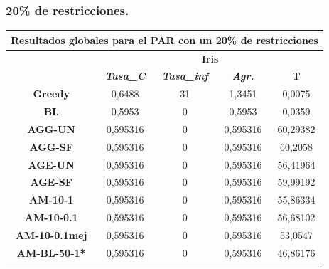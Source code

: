 \documentclass[12pt, spanish]{article}
\begin{document}
\subsubsection{20\% de restricciones.}

\begin{table}[H]
\centering
\begin{tabular}{|c|c|c|c|c|}
\hline
\multicolumn{5}{|c|}{\textbf{Resultados globales para el PAR con un 20\% de restricciones}}                                 \\ \hline
\multirow{2}{*}{}           & \multicolumn{4}{c|}{\textbf{Iris}}                                                            \\ \cline{2-5} 
                            & \textit{\textbf{Tasa\_C}} & \textit{\textbf{Tasa\_inf}} & \textit{\textbf{Agr.}} & \textbf{T} \\ \hline
\textbf{Greedy}             & 0,6488                    & 31                          & 1,3451                 & 0,0075     \\ \hline
\textbf{BL}                 & 0,5953                    & 0                           & 0,5953                 & 0,0359     \\ \hline
\textbf{AGG-UN}             & 0,595316                  & 0                           & 0,595316               & 60,29382   \\ \hline
\textbf{AGG-SF}             & 0,595316                  & 0                           & 0,595316               & 60,2058    \\ \hline
\textbf{AGE-UN}             & 0,595316                  & 0                           & 0,595316               & 56,41964   \\ \hline
\textbf{AGE-SF}             & 0,595316                  & 0                           & 0,595316               & 59,99192   \\ \hline
\textbf{AM-10-1}            & 0,595316                  & 0                           & 0,595316               & 55,86334   \\ \hline
\textbf{AM-10-0.1}          & 0,595316                  & 0                           & 0,595316               & 56,68102   \\ \hline
\textbf{AM-10-0.1mej}       & 0,595316                  & 0                           & 0,595316               & 53,0547    \\ \hline
\textbf{AM-BL-50-1*}        & 0,595316                  & 0                           & 0,595316               & 46,86176   \\ \hline

\end{tabular}
\end{table}
\end{document}
